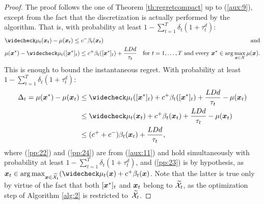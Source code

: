 \documentclass{article}
\begin{document}
\regretdiscretized*
\begin{proof}
	The proof follows the one of Theorem \ref{th:regretcompact} up to (\ref{aux:9}), except from the fact that the discretization is actually performed by the algorithm. That is, with probability at least $1-\sum_{t=1}^{T}\delta_t(1+\tau_t^d)$:
	\begin{align}
		&\wc{\mu}_t(\vx_t) - \mu(\vx_t) \leq c^{-}\beta_t(\vx_t) &\text{and}\nonumber\\
		&\mu(\vx^*) - \wc{\mu}_t([\vx^*]_t) \leq c^{+}\beta_t([\vx^*]_t) + \frac{LDd}{\tau_t}
		&\text{for $t=1,\dots,T$ and every $\vx^*\in\arg\max_{\vx\in\Xspace}\mu(\vx)$.}\label{aux:11}
	\end{align}
	This is enough to bound the instantaneous regret. With probability at least $1-\sum_{t=1}^{T}\delta_t(1+\tau_t^d)$:
	\begin{align}
		\Delta_t = \mu(\vx^*) - \mu(\vx_t) 
		&\leq \wc{\mu}_t([\vx^*]_t) + c^{+}\beta_t([\vx^*]_t) + \frac{LDd}{\tau_t} - \mu(\vx_t) \label{pp:23}\\
		&\leq \wc{\mu}_t(\vx_t) + c^{+}\beta_t(\vx_t) + \frac{LDd}{\tau_t} - \mu(\vx_t) \label{pp:24}\\
		&\leq (c^{+}+c^{-})\beta_t(\vx_t) + \frac{LDd}{\tau_t}, \label{aux:12}
	\end{align}
	where (\ref{pp:22}) and (\ref{pp:24}) are from (\ref{aux:11}) and hold simultaneously with probability at least $1-\sum_{t=1}^{T}\delta_t(1+\tau_t^d)$, and (\ref{pp:23}) is by hypothesis, as $\vx_t \in \arg\max_{\vx\in\wt{\Xspace}_t}(\wc{\mu}_t(\vx) + c^{+}\beta_t(\vx)$. Note that the latter is true only by virtue of the fact that both $[\boldsymbol{x}^*]_t$ and $\boldsymbol{x}_t$ belong to $\widetilde{\mathcal{X}}_t$, as the optimization step of Algorithm \ref{alg:2} is restricted to~$\widetilde{\mathcal{X}}_t$.
	

\end{proof}
\end{document}
